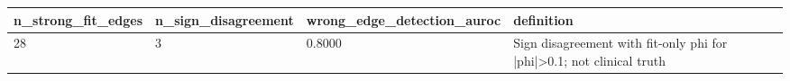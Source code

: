 \begin{tabular}{llll}
\hline
n\_strong\_fit\_edges & n\_sign\_disagreement & wrong\_edge\_detection\_auroc & definition \\
\hline
28 & 3 & 0.8000 & Sign disagreement with fit-only phi for |phi|>0.1; not clinical truth \\
\hline
\end{tabular}
